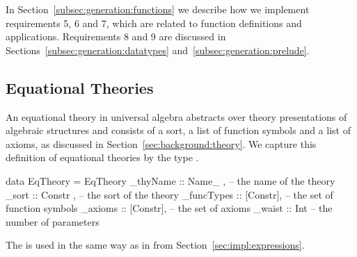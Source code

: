 In Section~\ref{subsec:generation:functions} we describe how we implement requirements 5, 6 and 7, which are related to function definitions and applications. Requirements 8 and 9 are discussed in Sections~\ref{subsec:generation:datatypes} and~\ref{subsec:generation:prelude}.   
 


\subsection{Equational Theories}
\label{subsec:generation:eqTheories}
An equational theory in universal algebra abstracts over theory presentations of algebraic structures and consists of a sort, a list of function symbols and a list of axioms, as discussed in Section~\ref{sec:background:theory}. We capture this definition of equational theories by the type . 
\begin{hscode}
data EqTheory = EqTheory {
  _thyName    :: Name_  ,   -- the name of the theory 
  _sort       :: Constr ,   -- the sort of the theory 
  _funcTypes  :: [Constr],  -- the set of function symbols 
  _axioms     :: [Constr],  -- the set of axioms 
  _waist      :: Int }      -- the number of parameters 
\end{hscode}
The  is used in the same way as in  from Section~\ref{sec:impl:expressions}. 

